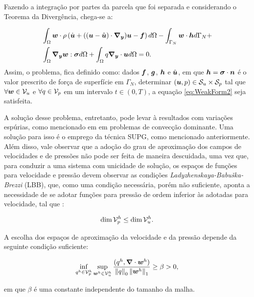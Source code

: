 Fazendo a integração por partes da parcela que foi separada e considerando o Teorema da Divergência, chega-se a:

\begin{equation}
    \begin{split}
        &\int_{\Omega}{\boldsymbol{w}\cdot\rho\left({\dot{\boldsymbol{u}}+((\boldsymbol{u}-\hat{\boldsymbol{u}})\cdot\boldsymbol{\nabla_y})\boldsymbol{u}-\boldsymbol{f}}\right) d\Omega}-\int_{\Gamma_N}{\boldsymbol{w}\cdot\boldsymbol{h} d\Gamma_N}+\\
        &\int_{\Omega}{\boldsymbol{\nabla_y}\boldsymbol{w}:\boldsymbol{\sigma} d\Omega}+\int_{\Omega}{q\boldsymbol{\nabla_y}\cdot\boldsymbol{u} d\Omega}=0\text{.}
    \end{split}
    \label{eq:WeakForm2}
\end{equation}
Assim, o problema, fica definido como: dados $\boldsymbol{f}$, $\boldsymbol{g}$, $\boldsymbol{h}$ e $\hat{\boldsymbol{u}}$, em que $\boldsymbol{h}=\boldsymbol{\sigma}\cdot\boldsymbol{n}$ é o valor prescrito de força de superfície em $\Gamma_N$, determinar $(\boldsymbol{u},p)\in\mathcal{S}_u\times\mathcal{S}_p$ tal que $\forall\boldsymbol{w}\in\mathcal{V}_u$ e $\forall q\in\mathcal{V}_p$ em um intervalo $t\in(0,T)$, a equação \eqref{eq:WeakForm2} seja satisfeita.

A solução desse problema, entretanto, pode levar à resultados com variações espúrias, como mencionado em \cite{fernandes2020tecnica,donea2003finite,brooks1982streamline} em problemas de convecção dominante. Uma solução para isso é o emprego da técnica SUPG, como mencionado anteriormente. Além disso, vale observar que a adoção do grau de aproximação dos campos de velocidades e de pressões não pode ser feita de maneira descuidada, uma vez que, para conduzir a uma sistema com unicidade de solução, os espaços de funções para velocidade e pressão devem observar as condições \textit{Ladyzhenskaya-Babuška-Brezzi} (LBB), que, como uma condição necessária, porém não suficiente, aponta a necessidade de se adotar funções para pressão de ordem inferior às adotadas para velocidade, tal que \cite{donea2003finite}:

\begin{equation}
    \dim{\mathcal{V}_p^h}\leq\dim{\mathcal{V}_u^h}\text{.}
\end{equation}

A escolha dos espaços de aproximação da velocidade e da pressão depende da seguinte condição suficiente:

\begin{equation}
    \inf_{q^h\in\mathcal{V}_p^h}{\sup_{\boldsymbol{w}^h\in\mathcal{V}_u^h}{\frac{(q^h,\boldsymbol{\nabla}\cdot\boldsymbol{w}^h)}{\left\lVert{q}\right\lVert_0\left\lVert{\boldsymbol{w}^h}\right\lVert_1}}}\geq\beta>0\text{,}
\end{equation}

\noindent em que $\beta$ é uma constante independente do tamanho da malha.

